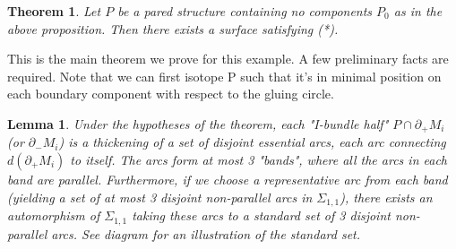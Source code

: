 \documentclass[12pt]{amsart}
\newtheorem{thm}[theorem]{Theorem}
\newtheorem{lemma}[theorem]{Lemma}
\theoremstyle{definition}
\newcommand{\bd}{\partial}
\newcommand{\Si}{\Sigma}
\begin{document}
\begin{thm}

Let $P$ be a pared structure containing no components $P_0$ as in the above
proposition. Then there exists a surface satisfying (*).

\end{thm}

This is the main theorem we prove for this example. A few preliminary facts are
required. Note that we can first isotope P such that it's in minimal position
on each boundary component with respect to the gluing circle.

\begin{lemma}

Under the hypotheses of the theorem, each "I-bundle half" $P \cap \bd_+M_i$ (or
$\bd_-M_i$) is a thickening of a set of disjoint essential arcs, each arc
connecting $d(\bd_+M_i)$ to itself. The arcs form at most 3 "bands", where all
the arcs in each band are parallel.  Furthermore, if we choose a representative
arc from each band (yielding a set of at most 3 disjoint non-parallel arcs in
$\Si_{1,1}$), there exists an automorphism of $\Si_{1,1}$ taking these arcs to
a standard set of 3 disjoint non-parallel arcs.  See diagram for an
illustration of the standard set.

\end{lemma}
\end{document}
